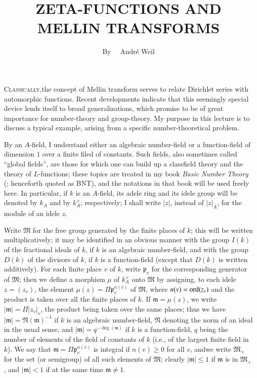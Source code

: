 \title{ZETA-FUNCTIONS AND MELLIN TRANSFORMS}

\author{By~~ Andr\'e Weil}
\date{}

\maketitle

\setcounter{pageoriginal}{408}
\textsc{Classically,}\pageoriginale the concept of Mellin transform serves to relate Dirichlet series with automorphic functions. Recent developments indicate that this seemingly special device lends itself to broad generalizations, which promise to be of great importance for number-theory and group-theory. My purpose in this lecture is to discuss a typical example, arising from a specific number-theoretical problem.

By an $A$-field, I understand either an algebraic number-field or a function-field of dimension $1$ over a finite filed of constants. Such fields, also sometimes called ``global fields'', are those for which one can build up a classfield theory and the theory of $L$-functions; these topics are treated in my book {\em Basic Number Theory} (\cite{art21-key3}; henceforth quoted as BNT), and the notations in that book will be used freely here. In particular, if $k$ is an $A$-field, its adele ring and its idele group will be denoted by $k_{A}$ and by $k^{\times}_{A}$, respectively; I shall write $|z|$, instead of $|z|_{A}$, for the module of an idele $z$.

Write $\mathfrak{M}$ for the free group generated by the finite places of $k$; this will be written multiplicatively; it may be identified in an obvious manner with the group $I(k)$ of the fractional ideals of $k$, if $k$ is an algebraic number-field, and with the group $D(k)$ of the divisors of $k$, if $k$ is a function-field (except that $D(k)$ is written additively). For each finite place $v$ of $k$, write $\mathfrak{p}_{v}$ for the corresponding generator of $\mathfrak{M}$; then we define a morphism $\mu$ of $k^{\times}_{A}$ onto $\mathfrak{M}$ by assigning, to each idele $z=(z_{v})$, the element $\mu(z)=\Pi \mathfrak{p}^{n(v)}_{v}$ of $\mathfrak{M}$, where $n(v)=\operatorname{\mathrm{ord}} (z_{v})$ and the product is taken over all the finite places of $k$. If $\mathfrak{m}=\mu(z)$, we write $|\mathfrak{m}|=\Pi |z_{v}|_{v}$, the product being taken over the same places; thus we have $|\mathfrak{m}|=\mathfrak{N}(\mathfrak{m})^{-1}$ if $k$ is an algebraic number-field, $\mathfrak{N}$ denoting the norm of an ideal in the usual sense, and $|\mathfrak{m}|=q^{-\deg(\mathfrak{m})}$ if $k$ is a function-field, $q$ being the number of elements of the field of constants of $k$ (i.e., of the largest finite field in $k$). We say that $\mathfrak{m}=\Pi \mathfrak{p}^{n(v)}_{v}$ is integral if $n(v)\geq 0$ for all $v$, and\pageoriginale we write $\mathfrak{M}_{+}$ for the set (or semigroup) of all such elements of $\mathfrak{M}$; clearly $|\mathfrak{m}|\leq 1$ if $\mathfrak{m}$ is in $\mathfrak{M}_{+}$, and $|\mathfrak{m}|<1$ if at the same time $\mathfrak{m}\neq 1$.


